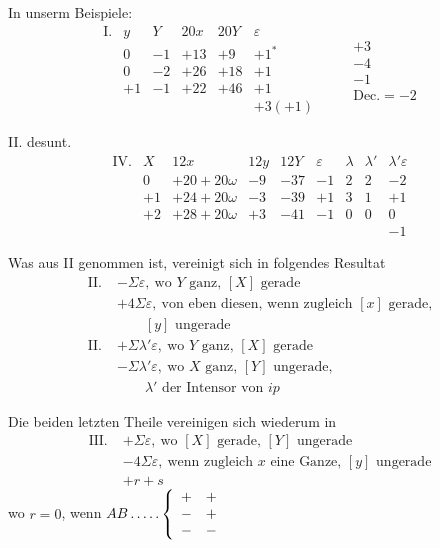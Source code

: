 In unserm Beispiele:
\[
\begin{array}{rc|r|r|r|r}
\mathrm{I.}&y&Y&20x&20Y&\varepsilon\\
&0&-1&+13&+9&+1^{*}\\
&0&-2&+26&+18&+1\\
&+1&-1&+22&+46&+1\\
&&&&&+3(+1)
\end{array}
\qquad
\begin{array}{r}
+3\\-4\\-1\\\hline
\text{Dec.}=-2
\end{array}
\]

II. desunt.
\begingroup\small\setlength{\arraycolsep}{2pt}
\[
\begin{array}{rc|r|r|r|r|r|r|r}
\mathrm{IV.}&X&12x&12y&12Y&\varepsilon&\lambda&\lambda'&\lambda'\varepsilon\\
&0&+20+20\omega&-9&-37&-1&2&2&-2\\
&+1&+24+20\omega&-3&-39&+1&3&1&+1\\
&+2&+28+20\omega&+3&-41&-1&0&0&0\\
&&&&&&&&-1
\end{array}
\]
\endgroup

%
Was aus II genommen ist, vereinigt sich in folgendes Resultat
\[
\begin{aligned}
\mathrm{II.}\;&-\Sigma\varepsilon,\ \text{wo }Y\text{ ganz, }[X]\text{ gerade}\\
&+4\Sigma\varepsilon,\ \text{von eben diesen, wenn zugleich }[x]\text{ gerade,}\\
&\qquad[y]\text{ ungerade}\\
\mathrm{II.}\;&+\Sigma\lambda'\varepsilon,\ \text{wo }Y\text{ ganz, }[X]\text{ gerade}\\
&-\Sigma\lambda'\varepsilon,\ \text{wo }X\text{ ganz, }[Y]\text{ ungerade,}\\
&\qquad\lambda'\text{ der Intensor von }ip
\end{aligned}
\]

Die beiden letzten Theile vereinigen sich wiederum in
\[
\begin{aligned}
\mathrm{III.}\;&+\Sigma\varepsilon,\ \text{wo }[X]\text{ gerade, }[Y]\text{ ungerade}\\
&-4\Sigma\varepsilon,\ \text{wenn zugleich }x\text{ eine Ganze, }[y]\text{ ungerade}\\
&+r+s
\end{aligned}
\]
wo $r=0$, wenn $AB\mathinner{.\,.\,.\,.\,.}\left\{\begin{array}{cc}+&+\\-&+\\-&-\end{array}\right.$

